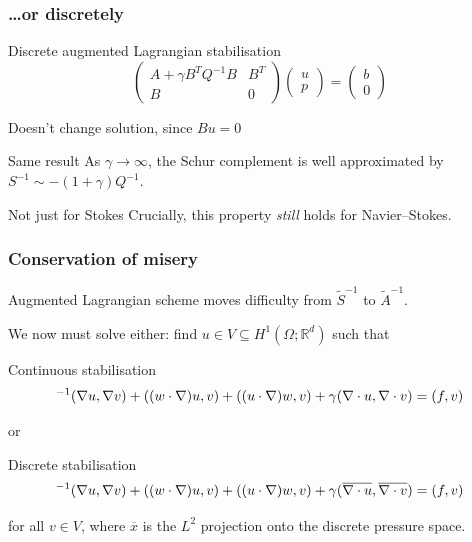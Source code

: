 \documentclass[presentation, 10pt]{beamer}
\let\Re\relax
\DeclareMathOperator{\Re}{Re}
\newcommand{\honev}{\ensuremath{{H}^1(\Omega; \mathbb{R}^d)}\xspace}
\begin{document}
\begin{frame}[t]
  \frametitle{\dots or discretely}
  \begin{block}{Discrete augmented Lagrangian stabilisation}
    \vspace{0.25\baselineskip}
    \begin{equation*}
      \begin{pmatrix}
        A + \gamma B^T Q^{-1} B & B^T \\
        B & 0
      \end{pmatrix}
      \begin{pmatrix}
        u \\ p
      \end{pmatrix}
      =
      \begin{pmatrix}
        b \\ 0
      \end{pmatrix}
    \end{equation*}
  \end{block}

  Doesn't change solution, since $B u = 0$
  \begin{block}{Same result}
    \vspace{0.25\baselineskip}
    As $\gamma \to \infty$, the Schur complement is well approximated
    by $S^{-1} \sim -(1 + \gamma)Q^{-1}$.
  \end{block}

  \pause

  \begin{alertblock}{Not just for Stokes}
    \vspace{0.25\baselineskip}
    Crucially, this property \emph{still} holds for Navier--Stokes.
  \end{alertblock}
\end{frame}

\begin{frame}[t]
  \frametitle{Conservation of misery}
  Augmented Lagrangian scheme moves difficulty from $\tilde{S}^{-1}$
  to $\tilde{A}^{-1}$.

  We now must solve either: find $u \in V \subseteq \honev$ such that
  \begin{block}{Continuous stabilisation}
    \begin{equation*}
      \Re^{-1} (\nabla u, \nabla v) + ((w \cdot \nabla)u, v) + ((u \cdot
      \nabla)w, v) + \gamma(\nabla \cdot u, \nabla \cdot v) = (f, v)
    \end{equation*}
  \end{block}
  \vspace{-0.5\baselineskip}
  or 
  \begin{block}{Discrete stabilisation}
    \begin{equation*}
    \Re^{-1} (\nabla u, \nabla v) + ((w \cdot \nabla)u, v) + ((u \cdot \nabla)w, v) + \gamma(\overline{\nabla \cdot u}, \overline{\nabla \cdot v}) = (f, v)
  \end{equation*}
  \end{block}
  \vspace{-0.5\baselineskip}
  for all $v \in V$, where $\overline{x}$ is the $L^2$ projection onto the discrete pressure space.
\end{frame}
\end{document}

